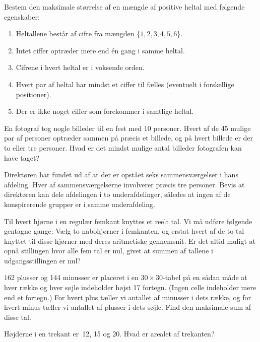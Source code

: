 \documentclass{bw06}
\begin{document}
\begin{problems}
\item Bestem den maksimale st\o rrelse af en m\ae ngde af positive
 heltal med f\o lgende egenskaber:
\begin{enumerate}
\item Heltallene best\aa r af cifre fra m\ae ngden $\{1,2,3,4,5,6\}$.
\item Intet ciffer optr\ae der mere end \'en gang i samme heltal.
\item Cifrene i hvert heltal er i voksende orden.
\item Hvert par af heltal har mindst et ciffer til f\ae lles (eventuelt 
i forskellige positioner).
\item Der er ikke noget ciffer som forekommer i samtlige heltal.
\end{enumerate}

\item En fotograf tog nogle billeder til en fest med 10 personer. Hvert
 af de 45 mulige par af personer optr\ae der sammen p\aa{} pr\ae cis et
 billede, og p\aa{} hvert billede er der to
 eller tre personer. Hvad er det mindst mulige antal billeder fotografen 
kan have taget?

\item Direkt\o ren har fundet ud af at der er opst\aa et seks
 sammensv\ae rgelser i hans afdeling. Hver af sammensv\ae rgelserne
 involverer pr\ae cis tre personer. Bevis at direkt\o ren
 kan dele afdelingen i to underafdelinger, s\aa ledes at ingen af de
 konspirerende grupper er i samme underafdeling.

\item Til hvert hj\o rne i en regul\ae r femkant knyttes et reelt tal. 
Vi m\aa{} udf\o re f\o lgende gentagne gange: V\ae lg to nabohj\o rner i
 femkanten, og erstat hvert af de to tal knyttet til 
disse hj\o rner med deres aritmetiske gennemsnit. Er det altid muligt at 
opn\aa{} stillingen hvor alle fem tal er nul, 
givet at summen af tallene i udgangsstillingen er nul?

\item $162$ plusser og 144 minusser er placeret i en $30\times 30$-tabel 
p\aa{} en s\aa dan m\aa de at hver r\ae kke og hver s\o jle indeholder h\o jst 17 fortegn.
(Ingen celle indeholder mere end et fortegn.)
For hvert plus t\ae ller vi antallet af minusser i dets r\ae kke, og for
 hvert minus t\ae ller vi antallet af plusser i dets s\o jle. Find den maksimale sum af disse tal.

\item H\o jderne i en trekant er~12, 15 og 20. Hvad er arealet af trekanten?


\end{problems}
\end{document}

